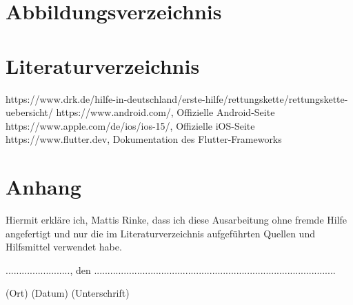 \documentclass[12pt]{article}
\begin{document}
\section{Abbildungsverzeichnis}
\section{Literaturverzeichnis}

\begin{thebibliography}{9}
    https://www.drk.de/hilfe-in-deutschland/erste-hilfe/rettungskette/rettungskette-uebersicht/
    https://www.android.com/, Offizielle Android-Seite
    https://www.apple.com/de/ios/ios-15/, Offizielle iOS-Seite
    https://www.flutter.dev, Dokumentation des Flutter-Frameworks
\end{thebibliography}

\section{Anhang}

Hiermit erkläre ich, Mattis Rinke, dass ich diese Ausarbeitung ohne fremde Hilfe
angefertigt und nur die im Literaturverzeichnis aufgeführten
Quellen und Hilfsmittel verwendet habe.\\
\begin{center}
    ........................, den ..........................................................................................

\end{center}
\quad\quad  (Ort)    \hfil           (Datum)                   \hfil  (Unterschrift)
\end{document}
